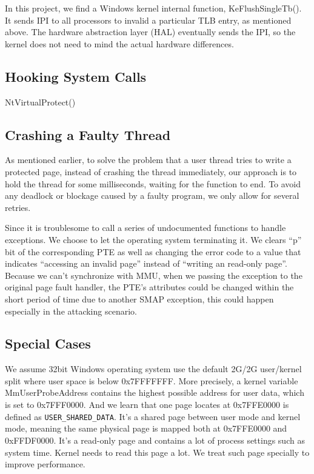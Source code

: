 In this project, we find a Windows kernel internal function, KeFlushSingleTb(). It sends IPI to all processors to invalid a particular TLB entry, as mentioned above. The hardware abstraction layer (HAL) eventually sends the IPI, so the kernel does not need to mind the actual hardware differences.

\subsection{Hooking System Calls}

NtVirtualProtect()

\subsection{Crashing a Faulty Thread}

As mentioned earlier, to solve the problem that a user thread tries to write a protected page, instead of crashing the thread immediately, our approach is to hold the thread for some milliseconds, waiting for the function to end. To avoid any deadlock or blockage caused by a faulty program, we only allow for several retries. 

Since it is troublesome to call a series of undocumented functions to handle exceptions. We choose to let the operating system terminating it. We clears ``p'' bit of the corresponding PTE as well as changing the error code to a value that indicates ``accessing an invalid page'' instead of ``writing an read-only page''. Because we can't synchronize with MMU, when we passing the exception to the original page fault handler, the PTE's attributes could be changed within the short period of time due to another SMAP exception, this could happen especially in the attacking scenario. 



\subsection{Special Cases}
We assume 32bit Windows operating system use the default 2G/2G user/kernel split where user space is below 0x7FFFFFFF. More precisely, a kernel variable MmUserProbeAddress contains the highest possible address for user data, which is set to 0x7FFF0000. And we learn that one page locates at 0x7FFE0000 is defined as \texttt{USER\_SHARED\_DATA}. It's a shared page between user mode and kernel mode, meaning the same physical page is mapped both at 0x7FFE0000 and 0xFFDF0000. It's a read-only page and contains a lot of process settings such as system time. Kernel needs to read this page a lot. We treat such page specially to improve performance. 


